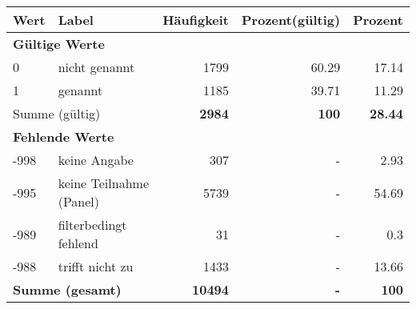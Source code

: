      \begin{longtable}{lXrrr}
     \toprule
     \textbf{Wert} & \textbf{Label} & \textbf{Häufigkeit} & \textbf{Prozent(gültig)} & \textbf{Prozent} \\
     \endhead
     \midrule
     \multicolumn{5}{l}{\textbf{Gültige Werte}}\\

     0 &
     \multicolumn{1}{X}{ nicht genannt   } &


       \num{1799} &
       \num[round-mode=places,round-precision=2]{60,29} &
         \num[round-mode=places,round-precision=2]{17,14} \\

     1 &
     \multicolumn{1}{X}{ genannt   } &


       \num{1185} &
       \num[round-mode=places,round-precision=2]{39,71} &
         \num[round-mode=places,round-precision=2]{11,29} \\
     \midrule
     \multicolumn{2}{l}{Summe (gültig)} &
       \textbf{\num{2984}} &
     \textbf{100} &
       \textbf{\num[round-mode=places,round-precision=2]{28,44}} \\
     \multicolumn{5}{l}{\textbf{Fehlende Werte}}\\
       -998 &
       keine Angabe &
         \num{307} &
        - &
         \num[round-mode=places,round-precision=2]{2,93} \\
       -995 &
       keine Teilnahme (Panel) &
         \num{5739} &
        - &
         \num[round-mode=places,round-precision=2]{54,69} \\
       -989 &
       filterbedingt fehlend &
         \num{31} &
        - &
         \num[round-mode=places,round-precision=2]{0,3} \\
       -988 &
       trifft nicht zu &
         \num{1433} &
        - &
         \num[round-mode=places,round-precision=2]{13,66} \\
     \midrule
     \multicolumn{2}{l}{\textbf{Summe (gesamt)}} &
          \textbf{\num{10494}} &
        \textbf{-} &
        \textbf{100} \\
     \bottomrule
     \end{longtable}
     
